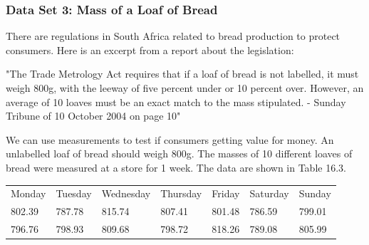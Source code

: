 \begin{description}[noitemsep]
\begin{description}[noitemsep]
            \subsubsection{ Data Set 3: Mass of a Loaf of Bread}
            \nopagebreak
        \label{m39403*id203270}There are regulations in South Africa related to bread production to protect consumers. Here is an excerpt from a report about the legislation:\par 
        \label{m39403*id203274}"The Trade Metrology Act requires that if a loaf of bread is not labelled, it must weigh 800g, with the leeway of five percent under or 10 percent over. However, an average of 10 loaves must be an exact match to the mass stipulated. - Sunday Tribune of 10 October 2004 on page 10"\par 
        \label{m39403*id203280}We can use measurements to test if consumers getting value for money. An unlabelled loaf of bread should weigh 800g. The masses of 10 different loaves of bread were measured at a store for 1 week. The data are shown in Table 16.3.\par 
          \begin{table}
        \begin{center}
      \label{m39403*uid29}
    \noindent
      \tablelasttail{}
      \begin{xtabular}[t]{|l|l|l|l|l|l|l|}\hline
        Monday &
        Tuesday &
        Wednesday &
        Thursday &
        Friday &
        Saturday &
        Sunday%
     \tabularnewline{}
        802.39 &
        787.78 &
        815.74 &
        807.41 &
        801.48 &
        786.59 &
        799.01%
     \tabularnewline{}
        796.76 &
        798.93 &
        809.68 &
        798.72 &
        818.26 &
        789.08 &
        805.99%
     \tabularnewline{}

\end{xtabular}
\end{center}
\end{table}
\end{description}
\end{description}
